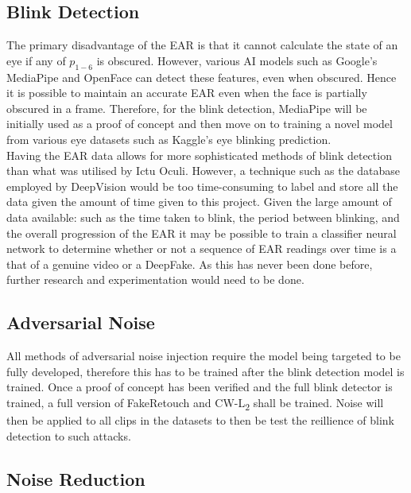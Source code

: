 \documentclass{article}
\begin{document}
\subsection{Blink Detection} \label{sec:future-blink}

The primary disadvantage of the EAR is that it cannot calculate the state of an eye if any of $p_{1-6}$ is obscured\cite{ictuoculi}. However, various AI models such as Google's MediaPipe\cite{mediapipe} and OpenFace\cite{openface} can detect these features, even when obscured. Hence it is possible to maintain an accurate EAR even when the face is partially obscured in a frame. Therefore, for the blink detection, MediaPipe will be initially used as a proof of concept and then move on to training a novel model from various eye datasets such as Kaggle's eye blinking prediction\cite{eyeblinkprediction}.\\

Having the EAR data allows for more sophisticated methods of blink detection than what was utilised by Ictu Oculi. However, a technique such as the database employed by DeepVision\cite{blinking-pattern} would be too time-consuming to label and store all the data given the amount of time given to this project. Given the large amount of data available: such as the time taken to blink, the period between blinking, and the overall progression of the EAR it may be possible to train a classifier neural network to determine whether or not a sequence of EAR readings over time is a that of a genuine video or a DeepFake. As this has never been done before, further research and experimentation would need to be done.

\subsection{Adversarial Noise} \label{sec:future-noise}

All methods of adversarial noise injection require the model being targeted to be fully developed, therefore this has to be trained after the blink detection model is trained. Once a proof of concept has been verified and the full blink detector is trained, a full version of FakeRetouch and CW-L\textsubscript{2} shall be trained. Noise will then be applied to all clips in the datasets to then be test the reillience of blink detection to such attacks.

\subsection{Noise Reduction}
\end{document}

